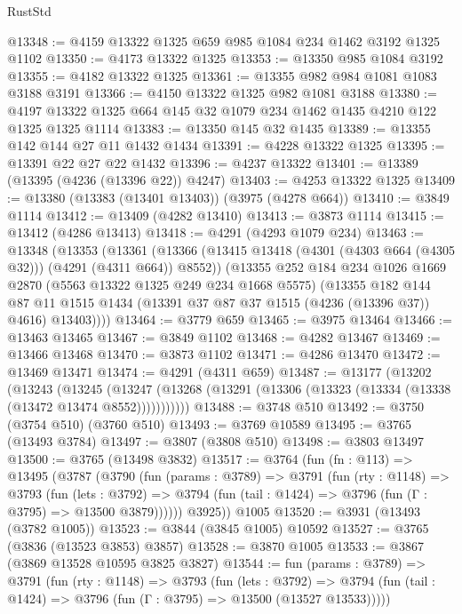 \begin{lexlean}{RustStd}
\begin{coremodule}
@13348 := @4159 @13322 @1325 @659 @985 @1084 @234 @1462 @3192 @1325 @1102
@13350 := @4173 @13322 @1325
@13353 := @13350 @985 @1084 @3192
@13355 := @4182 @13322 @1325
@13361 := @13355 @982 @984 @1081 @1083 @3188 @3191
@13366 := @4150 @13322 @1325 @982 @1081 @3188
@13380 := @4197 @13322 @1325 @664 @145 @32 @1079 @234 @1462 @1435 @4210 @122 @1325 @1325 @1114
@13383 := @13350 @145 @32 @1435
@13389 := @13355 @142 @144 @27 @11 @1432 @1434
@13391 := @4228 @13322 @1325
@13395 := @13391 @22 @27 @22 @1432
@13396 := @4237 @13322
@13401 := @13389 (@13395 (@4236 (@13396 @22)) @4247)
@13403 := @4253 @13322 @1325
@13409 := @13380 (@13383 (@13401 @13403)) (@3975 (@4278 @664))
@13410 := @3849 @1114
@13412 := @13409 (@4282 @13410)
@13413 := @3873 @1114
@13415 := @13412 (@4286 @13413)
@13418 := @4291 (@4293 @1079 @234)
@13463 := @13348
    (@13353
      (@13361
        (@13366 (@13415 @13418 (@4301 (@4303 @664 (@4305 @32))) (@4291 (@4311 @664)) @8552))
        (@13355
          @252
          @184
          @234
          @1026
          @1669
          @2870
          (@5563 @13322 @1325 @249 @234 @1668 @5575)
          (@13355
            @182
            @144
            @87
            @11
            @1515
            @1434
            (@13391 @37 @87 @37 @1515 (@4236 (@13396 @37)) @4616)
            @13403))))
@13464 := @3779 @659
@13465 := @3975 @13464
@13466 := @13463 @13465
@13467 := @3849 @1102
@13468 := @4282 @13467
@13469 := @13466 @13468
@13470 := @3873 @1102
@13471 := @4286 @13470
@13472 := @13469 @13471
@13474 := @4291 (@4311 @659)
@13487 := @13177
    (@13202
      (@13243
        (@13245
          (@13247 (@13268 (@13291 (@13306 (@13323 (@13334 (@13338 (@13472 @13474 @8552)))))))))))
@13488 := @3748 @510
@13492 := @3750 (@3754 @510) (@3760 @510)
@13493 := @3769 @10589
@13495 := @3765 (@13493 @3784)
@13497 := @3807 (@3808 @510)
@13498 := @3803 @13497
@13500 := @3765 (@13498 @3832)
@13517 := @3764
    (fun (fn : @113) =>
    @13495
      (@3787
        (@3790
          (fun (params : @3789) =>
          @3791
            (fun (rty : @1148) =>
            @3793
              (fun (lets : @3792) =>
              @3794 (fun (tail : @1424) => @3796 (fun (Γ : @3795) => @13500 @3879))))))
        @3925))
    @1005
@13520 := @3931 (@13493 (@3782 @1005))
@13523 := @3844 (@3845 @1005) @10592
@13527 := @3765 (@3836 (@13523 @3853) @3857)
@13528 := @3870 @1005
@13533 := @3867 (@3869 @13528 @10595 @3825 @3827)
@13544 := fun (params : @3789) =>
  @3791
    (fun (rty : @1148) =>
    @3793
      (fun (lets : @3792) =>
      @3794 (fun (tail : @1424) => @3796 (fun (Γ : @3795) => @13500 (@13527 @13533)))))

\end{coremodule}
\end{lexlean}
